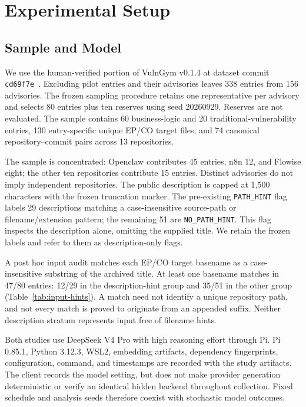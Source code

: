 \section{Experimental Setup}
\label{sec:setup}
\subsection{Sample and Model}
We use the human-verified portion of VulnGym v0.1.4 at dataset commit \texttt{cd69f7e}~\cite{vulngymdata}. Excluding pilot entries and their advisories leaves 338 entries from 156 advisories. The frozen sampling procedure retains one representative per advisory and selects 80 entries plus ten reserves using seed 20260929. Reserves are not evaluated. The sample contains 60 business-logic and 20 traditional-vulnerability entries, 130 entry-specific unique EP/CO target files, and 74 canonical repository--commit pairs across 13 repositories.

The sample is concentrated: Openclaw contributes 45 entries, n8n 12, and Flowise eight; the other ten repositories contribute 15 entries. Distinct advisories do not imply independent repositories. The public description is capped at 1,500 characters with the frozen truncation marker. The pre-existing \texttt{PATH\_HINT} flag labels 29 descriptions matching a case-insensitive source-path or filename/extension pattern; the remaining 51 are \texttt{NO\_PATH\_HINT}. This flag inspects the description alone, omitting the supplied title. We retain the frozen labels and refer to them as description-only flags.

A post hoc input audit matches each EP/CO target basename as a case-insensitive substring of the archived title. At least one basename matches in 47/80 entries: 12/29 in the description-hint group and 35/51 in the other group (Table~\ref{tab:input-hints}). A match need not identify a unique repository path, and not every match is proved to originate from an appended suffix. Neither description stratum represents input free of filename hints.


Both studies use DeepSeek V4 Pro with high reasoning effort through Pi. Pi 0.85.1, Python 3.12.3, WSL2, embedding artifacts, dependency fingerprints, configuration, command, and timestamps are recorded with the study artifacts. The client records the model setting, but does not make provider generation deterministic or verify an identical hidden backend throughout collection. Fixed schedule and analysis seeds therefore coexist with stochastic model outcomes.

